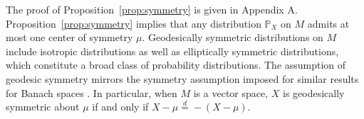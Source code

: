 \documentclass[preprint]{imsart}
\theoremstyle{plain}
\theoremstyle{remark}
\begin{document}



 




The proof of Proposition~\ref{prop:symmetry} is given in Appendix A. Proposition~\ref{prop:symmetry} implies that any distribution $\mathbb{P}_{X}$ on $M$ admits at most one center of symmetry $\mu$. Geodesically symmetric distributions on $M$ include isotropic distributions as well as elliptically symmetric distributions, which constitute a broad class of probability distributions.
%
The assumption of geodesic symmetry mirrors the symmetry assumption imposed for similar results for Banach spaces \citep{marcus1979stable}. In particular, when $M$ is a vector space, $X$ is geodesically symmetric about $\mu$ if and only if $X -\mu \stackrel{d}{=} -(X - \mu)$.
\end{document}
